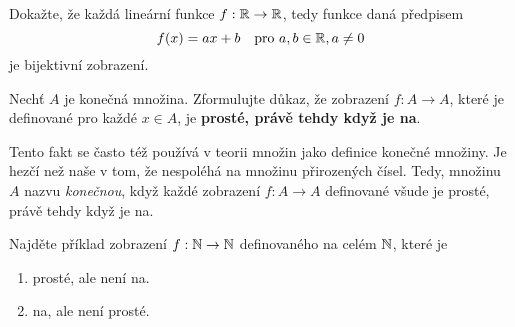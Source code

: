 \begin{exercise}
 Dokažte, že každá lineární funkce $f:\mathbb{R} \to \mathbb{R}$, tedy funkce daná předpisem
 \[
  f(x) = ax + b \quad \text{pro } a,b \in \mathbb{R},a \neq 0
 \]
 je bijektivní zobrazení.
\end{exercise}

\begin{exercise}
 \label{ex:proste-iff-na}
 Nechť $A$ je konečná množina. Zformulujte důkaz, že zobrazení ${f:A \to A}$,
 které je definované pro každé $x \in A$, je \textbf{prosté, právě tehdy když je
 na}.

 Tento fakt se často též používá v teorii množin jako definice konečné množiny.
 Je hezčí než naše v tom, že nespoléhá na množinu přirozených čísel. Tedy,
 množinu $A$ nazvu \emph{konečnou}, když každé zobrazení $f:A \to A$ definované
 všude je prosté, právě tehdy když je na.
\end{exercise}

\begin{exercise}
 Najděte příklad zobrazení $f:\mathbb{N} \to \mathbb{N}$ definovaného na celém $\mathbb{N}$, které je
 \begin{enumerate}
  \item prosté, ale není na.
  \item na, ale není prosté.
 \end{enumerate}
\end{exercise}
